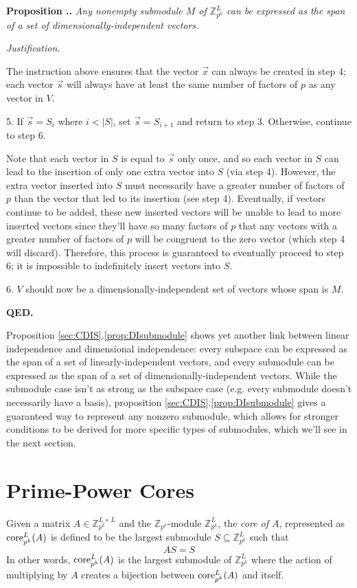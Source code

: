 \documentclass[a4paper, 12pt, reqno]{amsart}
\newcommand\core[3]{\textup{core}_{#1}^{#2}(#3)}
\newcounter{propcounter}[section]
\newenvironment{proposition}[1]
{
	\refstepcounter{propcounter}
	\textbf{Proposition \thesection.\thepropcounter.} \emph{#1}
	
	\emph{Justification.}
}
{
	\textbf{QED.} \\
}
\begin{document}
\begin{proposition}{Any nonempty submodule $M$ of $\mathds{Z}_{p^k}^L$ can be expressed as the span of a set of dimensionally-independent vectors.}
			The instruction above ensures that the vector $\vec{x}$ can always be created in step 4; each vector $\vec{s}$ will always have at least the same number of 
			factors of $p$ as any vector in $V$.
			
			5. If $\vec{s} = S_i$ where $i < |S|$, set $\vec{s} = S_{i+1}$ and return to step 3. Otherwise, continue to step 6. 
			
			Note that each vector in $S$ is equal to $\vec{s}$ only once, and so each vector in $S$ can lead to the insertion of only one extra vector into $S$ (via step 
			4). However, the extra vector inserted into $S$ must necessarily have a greater number of factors of $p$ than the vector that led to its insertion (see step 4). 
			Eventually, if vectors continue to be added, these new inserted vectors will be unable to lead to more inserted vectors since they'll have so many factors of $p$
			that any vectors with a greater	number of factors of $p$ will be congruent to the zero vector (which step 4 will discard). Therefore, this process is guaranteed 
			to eventually proceed to step 6; it is impossible to indefinitely insert vectors into $S$.
			
			6. $V$ should now be a dimensionally-independent set of vectors whose span is $M$.
		\end{proposition}
		
		Proposition \ref{sec:CDIS}.\ref{prop:DIsubmodule} shows yet another link between linear independence and dimensional independence: every subspace can be expressed
		as the span of a set of linearly-independent vectors, and every submodule can be expressed as the span of a set of dimensionally-independent vectors. While the
		submodule case isn't as strong as the subspace case (e.g. every submodule doesn't necessarily have a basis), proposition \ref{sec:CDIS}.\ref{prop:DIsubmodule}
		gives a guaranteed way to represent any nonzero submodule, which allows for stronger conditions to be derived for more specific types of submodules, which we'll see
		in the next section.
		
	\section{Prime-Power Cores}
		\label{sec:PPC}
		Given a matrix $A \in \mathds{Z}_{p^k}^{L \times L}$ and the $\mathds{Z}_{p^k}$-module $\mathds{Z}_{p^k}^L$, the \emph{core of $A$}, represented as 
		$\core{p^k}{L}{A}$ is defined to be the largest submodule $S \subseteq \mathds{Z}_{p^k}^L$ such that
		\[
			AS = S
		\]
		In other words, $\core{p^k}{L}{A}$ is the largest submodule of $\mathds{Z}_{p^k}^L$ where the action of multiplying by $A$ creates a bijection between 
		$\core{p^k}{L}{A}$ and itself.
		
\end{document}
